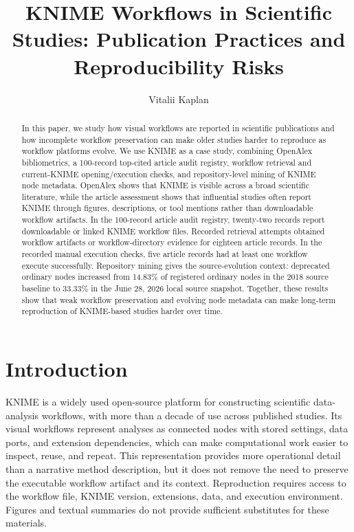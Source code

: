 \documentclass[runningheads]{llncs}
\title{KNIME Workflows in Scientific Studies:
Publication Practices and Reproducibility Risks}
\author{Vitalii Kaplan\orcidID{0009-0009-8181-2863}}
\institute{\email{2333275007@alu.istinye.edu.tr}}
\begin{document}
\maketitle

\begin{abstract}
In this paper, we study how visual workflows are reported in scientific
publications and how incomplete workflow preservation can make older studies
harder to reproduce as workflow platforms evolve. We use KNIME as a case
study, combining OpenAlex bibliometrics, a 100-record top-cited article audit
registry, workflow retrieval and current-KNIME opening/execution checks, and
repository-level mining of KNIME node metadata. OpenAlex shows that KNIME is
visible across a broad scientific literature, while the article assessment
shows that influential studies often report KNIME through figures,
descriptions, or tool mentions rather than downloadable workflow artifacts. In
the 100-record article audit registry, twenty-two records report
downloadable or linked KNIME workflow files. Recorded retrieval attempts
obtained workflow artifacts or workflow-directory evidence for eighteen article records. In the recorded
manual execution checks, five article records had at least one workflow execute
successfully.
Repository mining gives the source-evolution context: deprecated ordinary
nodes increased from 14.83\% of registered ordinary nodes in the 2018 source
baseline to 33.33\% in the June 28, 2026 local source snapshot. Together,
these results show that weak workflow preservation and evolving node metadata
can make long-term reproduction of KNIME-based studies harder over time.

\end{abstract}

\section{Introduction}

KNIME is a widely used open-source platform for constructing scientific
data-analysis workflows, with more than a decade of use across published
studies. Its visual workflows represent analyses as connected nodes with
stored settings, data ports, and extension dependencies, which can make
computational work easier to inspect, reuse, and repeat. This representation
provides more operational detail than a narrative method description, but it
does not remove the need to preserve the executable workflow artifact and its
context. Reproduction requires access to the workflow file, KNIME version,
extensions, data, and execution environment. Figures and textual summaries do
not provide sufficient substitutes for these materials.
\end{document}
